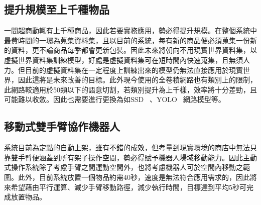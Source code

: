\subsection{提升規模至上千種物品}
一間超商動輒有上千種商品，因此若要實務應用，勢必得提升規模。在整個系統中最費時間的一環為蒐集資料集，且以目前的系統，每有新的商品便必須蒐集一份新的資料，更不論商品每季都會更新包裝。因此未來將朝向不用現實世界資料集，以虛擬世界資料集訓練模型，好處是虛擬資料集可在短時間內快速蒐集，且無須人力。但目前的虛擬資料集在一定程度上訓練出來的模型仍無法直接應用於現實世界，因此這將是未來改善的目標。此外現今使用的全卷積網路也有類別上的限制，此網路較適用於50類以下的語意切割，若類別提升為上千樣，效率將十分差勁，且可能難以收斂。因此也需要進行更換為如SSD ~\cite{liu2016ssd}、YOLO ~\cite{redmon2016you}網路模型等。

\subsection{移動式雙手臂協作機器人}
系統目前為定點的自動上架，雖有不錯的成效，但考量到現實環境的商店中無法只靠雙手臂便涵蓋到所有架子操作空間，勢必得賦予機器人場域移動能力。因此主動式操作系統除了考慮手臂之間運動空間外，也將考慮機器人可於空間內移動之範圍。此外，目前系統放置一個物品約需40秒，速度是無法符合應用需求的，因此將來希望藉由平行運算、減少手臂移動路徑，減少執行時間，目標達到平均5秒可完成放置物品。

